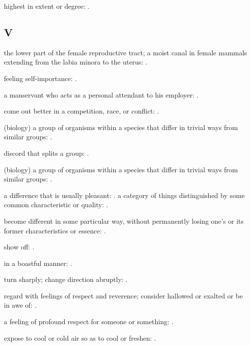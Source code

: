   highest in extent or degree: .

\subsection*{V}

  the lower part of the female reproductive tract; a moist canal in female mammals extending from the labia minora to the uterus: .

  feeling self-importance: .

  a manservant who acts as a personal attendant to his employer: .

  come out better in a competition, race, or conflict: .

  (biology) a group of organisms within a species that differ in trivial ways from similar groups: .

  discord that splits a group: .

  (biology) a group of organisms within a species that differ in trivial ways from similar groups: .

  a difference that is usually pleasant: . a category of things distinguished by some common characteristic or quality: .

  become different in some particular way, without permanently losing one's or its former characteristics or essence: .

  show off: .

  in a boastful manner: .

  turn sharply; change direction abruptly: .

  regard with feelings of respect and reverence; consider hallowed or exalted or be in awe of: .

  a feeling of profound respect for someone or something: .

  expose to cool or cold air so as to cool or freshen: .

